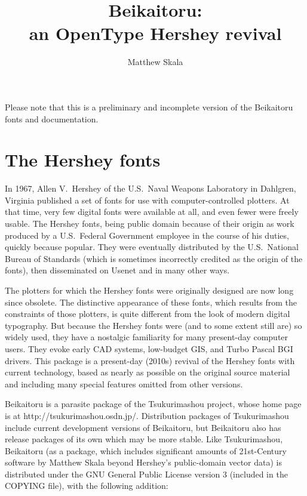\documentclass{article}
\title{Beikaitoru:\\an OpenType Hershey revival}
\author{Matthew Skala}
\begin{document}
\maketitle


Please note that this is a preliminary and incomplete version of the
Beikaitoru fonts and documentation.

\section{The Hershey fonts}

In 1967, Allen V.\ Hershey of the U.S.\ Naval Weapons Laboratory in
Dahlgren, Virginia published a set of fonts for use with computer-controlled
plotters.  At that time, very few digital fonts were available at all, and
even fewer were freely usable.  The Hershey fonts, being public domain
because of their origin as work produced by a U.S.\ Federal Government
employee in the course of his duties, quickly because popular.  They were
eventually distributed by the U.S.\ National Bureau of Standards (which is
sometimes incorrectly credited as the origin of the fonts), then
disseminated on Usenet and in many other ways.

The plotters for which the Hershey fonts were originally designed are now
long since obsolete.  The distinctive appearance of these fonts, which
results from the constraints of those plotters, is quite different from the
look of modern digital typography.  But because the Hershey fonts were (and
to some extent still are) so widely used, they have a nostalgic familiarity
for many present-day computer users.  They evoke early CAD systems,
low-budget GIS, and Turbo Pascal BGI drivers.  This package is a present-day
(2010s) revival of the Hershey fonts with current technology, based as
nearly as possible on the original source material and including many
special features omitted from other versions.

Beikaitoru is a parasite package of the Tsukurimashou project, whose home
page is at http://tsukurimashou.osdn.jp/.  Distribution packages of
Tsukurimashou include current development versions of Beikaitoru, but
Beikaitoru also has release packages of its own which may be more stable. 
Like Tsukurimashou, Beikaitoru (as a package, which includes significant
amounts of 21st-Century software by Matthew Skala beyond Hershey's
public-domain vector data) is distributed under the GNU General Public
License version 3 (included in the COPYING file), with the following
addition:
\end{document}
